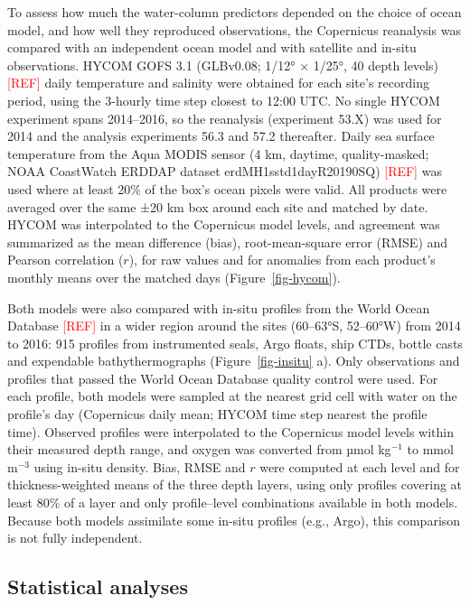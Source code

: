 \documentclass[
  11pt,
]{article}
\newcommand{\ins}[1]{\textcolor{red}{[#1]}}
\begin{document}
To assess how much the water-column predictors depended on the choice of
ocean model, and how well they reproduced observations, the Copernicus
reanalysis was compared with an independent ocean model and with
satellite and in-situ observations. HYCOM GOFS 3.1 (GLBv0.08; 1/12° ×
1/25°, 40 depth levels) \ins{REF} daily temperature and salinity were
obtained for each site's recording period, using the 3-hourly time step
closest to 12:00 UTC. No single HYCOM experiment spans 2014--2016, so
the reanalysis (experiment 53.X) was used for 2014 and the analysis
experiments 56.3 and 57.2 thereafter. Daily sea surface temperature from
the Aqua MODIS sensor (4 km, daytime, quality-masked; NOAA CoastWatch
ERDDAP dataset erdMH1sstd1dayR20190SQ) \ins{REF} was used where at least
20\% of the box's ocean pixels were valid. All products were averaged
over the same ±20 km box around each site and matched by date. HYCOM was
interpolated to the Copernicus model levels, and agreement was
summarized as the mean difference (bias), root-mean-square error (RMSE)
and Pearson correlation (\(r\)), for raw values and for anomalies from
each product's monthly means over the matched days
(Figure~\ref{fig-hycom}).

Both models were also compared with in-situ profiles from the World
Ocean Database \ins{REF} in a wider region around the sites (60--63°S,
52--60°W) from 2014 to 2016: 915 profiles from instrumented seals, Argo
floats, ship CTDs, bottle casts and expendable bathythermographs
(Figure~\ref{fig-insitu} a). Only observations and profiles that passed
the World Ocean Database quality control were used. For each profile,
both models were sampled at the nearest grid cell with water on the
profile's day (Copernicus daily mean; HYCOM time step nearest the
profile time). Observed profiles were interpolated to the Copernicus
model levels within their measured depth range, and oxygen was converted
from µmol kg\(^{-1}\) to mmol m\(^{-3}\) using in-situ density. Bias,
RMSE and \(r\) were computed at each level and for thickness-weighted
means of the three depth layers, using only profiles covering at least
80\% of a layer and only profile--level combinations available in both
models. Because both models assimilate some in-situ profiles (e.g.,
Argo), this comparison is not fully independent.

\subsection{Statistical analyses}\label{sec-stats}
\end{document}
